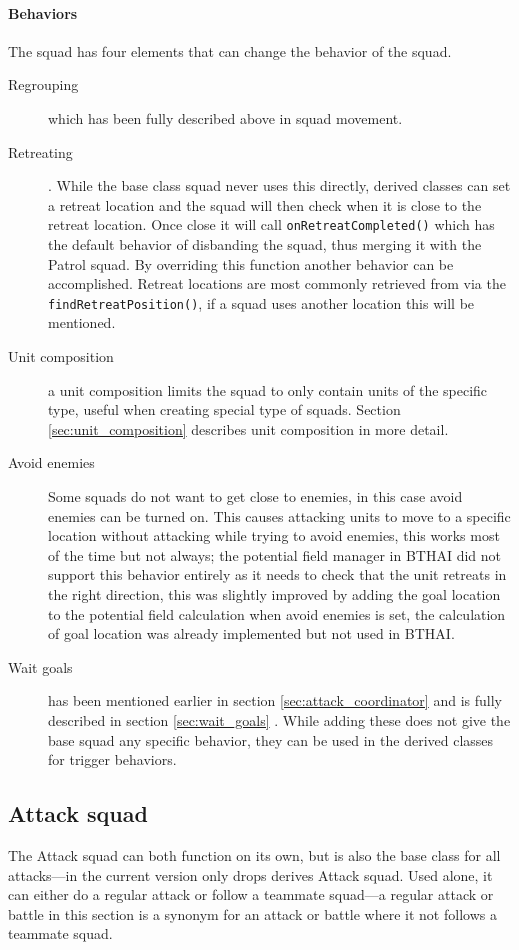 \paragraph{Behaviors}
The squad has four elements that can change the behavior of the squad.
\begin{description}
	\item[Regrouping] which has been fully described above in squad movement.
	\item[Retreating]. While the base class squad never uses this directly, derived classes can set a retreat location and the squad will then check when it is close to the retreat location. Once close it will call \texttt{onRetreatCompleted()} which has the default behavior of disbanding the squad, thus merging it with the Patrol squad. By overriding this function another behavior can be accomplished. Retreat locations are most commonly retrieved from  via the \texttt{findRetreatPosition()}, if a squad uses another location this will be mentioned.
	\item[Unit composition] a unit composition limits the squad to only contain units of the specific type, useful when creating special type of squads. Section \ref{sec:unit_composition} describes unit composition in more detail.
	\item[Avoid enemies] Some squads do not want to get close to enemies, in this case avoid enemies can be turned on. This causes attacking units to move to a specific location without attacking while trying to avoid enemies, this works most of the time but not always; the potential field manager in BTHAI did not support this behavior entirely as it needs to check that the unit retreats in the right direction, this was slightly improved by adding the goal location to the potential field calculation when avoid enemies is set, the calculation of goal location was already implemented but not used in BTHAI.
	\item[Wait goals] has been mentioned earlier in section \ref{sec:attack_coordinator}  and is fully described in section \ref{sec:wait_goals} . While adding these does not give the base squad any specific behavior, they can be used in the derived classes for trigger behaviors.
\end{description}

\subsection{Attack squad}
\label{sec:attack_squad} The Attack squad can both function on its own, but is also the base class
for all attacks—in the current version only drops derives Attack squad. Used alone, it can either do
a regular attack or follow a teammate squad—a regular attack or battle in this section is a synonym
for an attack or battle where it not follows a teammate squad.

